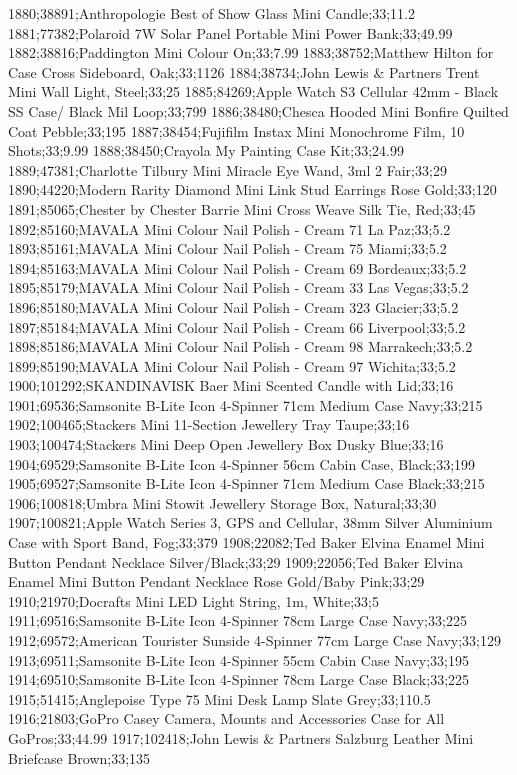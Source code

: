 1880;38891;Anthropologie Best of Show Glass Mini Candle;33;11.2
1881;77382;Polaroid 7W Solar Panel Portable Mini Power Bank;33;49.99
1882;38816;Paddington Mini Colour On;33;7.99
1883;38752;Matthew Hilton for Case Cross Sideboard, Oak;33;1126
1884;38734;John Lewis & Partners Trent Mini Wall Light, Steel;33;25
1885;84269;Apple Watch S3 Cellular 42mm - Black SS Case/ Black Mil Loop;33;799
1886;38480;Chesca Hooded Mini Bonfire Quilted Coat Pebble;33;195
1887;38454;Fujifilm Instax Mini Monochrome Film, 10 Shots;33;9.99
1888;38450;Crayola My Painting Case Kit;33;24.99
1889;47381;Charlotte Tilbury Mini Miracle Eye Wand, 3ml 2 Fair;33;29
1890;44220;Modern Rarity Diamond Mini Link Stud Earrings Rose Gold;33;120
1891;85065;Chester by Chester Barrie Mini Cross Weave Silk Tie, Red;33;45
1892;85160;MAVALA Mini Colour Nail Polish - Cream 71 La Paz;33;5.2
1893;85161;MAVALA Mini Colour Nail Polish - Cream 75 Miami;33;5.2
1894;85163;MAVALA Mini Colour Nail Polish - Cream 69 Bordeaux;33;5.2
1895;85179;MAVALA Mini Colour Nail Polish - Cream 33 Las Vegas;33;5.2
1896;85180;MAVALA Mini Colour Nail Polish - Cream 323 Glacier;33;5.2
1897;85184;MAVALA Mini Colour Nail Polish - Cream 66 Liverpool;33;5.2
1898;85186;MAVALA Mini Colour Nail Polish - Cream 98 Marrakech;33;5.2
1899;85190;MAVALA Mini Colour Nail Polish - Cream 97 Wichita;33;5.2
1900;101292;SKANDINAVISK Baer Mini Scented Candle with Lid;33;16
1901;69536;Samsonite B-Lite Icon 4-Spinner 71cm Medium Case Navy;33;215
1902;100465;Stackers Mini 11-Section Jewellery Tray Taupe;33;16
1903;100474;Stackers Mini Deep Open Jewellery Box Dusky Blue;33;16
1904;69529;Samsonite B-Lite Icon 4-Spinner 56cm Cabin Case, Black;33;199
1905;69527;Samsonite B-Lite Icon 4-Spinner 71cm Medium Case Black;33;215
1906;100818;Umbra Mini Stowit Jewellery Storage Box, Natural;33;30
1907;100821;Apple Watch Series 3, GPS and Cellular, 38mm Silver Aluminium Case with Sport Band, Fog;33;379
1908;22082;Ted Baker Elvina Enamel Mini Button Pendant Necklace Silver/Black;33;29
1909;22056;Ted Baker Elvina Enamel Mini Button Pendant Necklace Rose Gold/Baby Pink;33;29
1910;21970;Docrafts Mini LED Light String, 1m, White;33;5
1911;69516;Samsonite B-Lite Icon 4-Spinner 78cm Large Case Navy;33;225
1912;69572;American Tourister Sunside 4-Spinner 77cm Large Case Navy;33;129
1913;69511;Samsonite B-Lite Icon 4-Spinner 55cm Cabin Case Navy;33;195
1914;69510;Samsonite B-Lite Icon 4-Spinner 78cm Large Case Black;33;225
1915;51415;Anglepoise Type 75 Mini Desk Lamp Slate Grey;33;110.5
1916;21803;GoPro Casey Camera, Mounts and Accessories Case for All GoPros;33;44.99
1917;102418;John Lewis & Partners Salzburg Leather Mini Briefcase Brown;33;135
